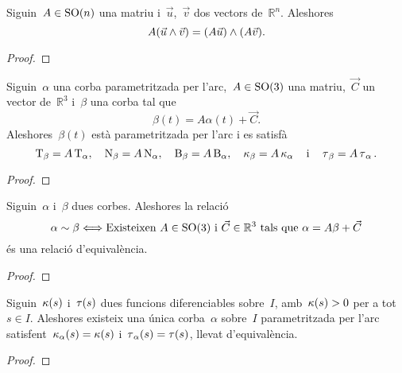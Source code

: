 \documentclass[../../main.tex]{subfiles}
\begin{document}
    \begin{proposition}
        \label{prop:les matrius especials ortogonals conserven el producte vectorial}
        Siguin~\(A\in\operatorname{SO}(n)\) una matriu i~\(\vec{u}\),~\(\vec{v}\) dos vectors de~\(\mathbb{R}^{n}\).
        Aleshores
        \[
            A(\vec{u}\mathbin{\wedge}\vec{v})=(A\vec{u})\mathbin{\wedge}(A\vec{v}).
        \]
        \begin{proof}
        \end{proof}
    \end{proposition}
    \begin{corollary}
        \label{cor:una corba parametritzada per l'arc i la seva imatge per una aplicació que conserva les distàncies són equivalents}
        Siguin~\(\alpha\) una corba parametritzada per l'arc,~\(A\in\operatorname{SO}(3)\) una matriu,~\(\vec{C}\) un vector de~\(\mathbb{R}^{3}\) i~\(\beta\) una corba tal que
        \[
            \beta(t)=A\alpha(t)+\vec{C}.
        \]
        Aleshores~\(\beta(t)\) està parametritzada per l'arc i es satisfà
        \[
            \operatorname{T}_{\beta}=A\operatorname{T}_{\alpha},\quad\operatorname{N}_{\beta}=A\operatorname{N}_{\alpha},\quad\operatorname{B}_{\beta}=A\operatorname{B}_{\alpha},\quad\operatorname{\kappa}_{\beta}=A\operatorname{\kappa}_{\alpha}\quad\text{i}\quad\operatorname{\tau}_{\beta}=A\operatorname{\tau}_{\alpha}.
        \]
        \begin{proof}
        \end{proof}
    \end{corollary}
    \begin{lemma}
        \label{lemma:Teorema Fonamental de la teoria local de corbes}
        Siguin~\(\alpha\) i~\(\beta\) dues corbes.
        Aleshores la relació
        \[
            \alpha\sim\beta \Longleftrightarrow \text{Existeixen }A\in\operatorname{SO}(3)\text{ i }\vec{C}\in\mathbb{R}^{3}\text{ tals que }\alpha=A\beta+\vec{C}
        \]
        és una relació d'equivalència.
        \begin{proof}
        \end{proof}
    \end{lemma}
    \begin{theorem}
        \label{thm:Teorema Fonamental de la teoria local del corbes}
        Siguin~\(\operatorname{\kappa}(s)\) i~\(\operatorname{\tau}(s)\) dues funcions diferenciables sobre~\(I\), amb~\(\operatorname{\kappa}(s)>0\) per a tot~\(s\in I\).
        Aleshores existeix una única corba~\(\alpha\) sobre~\(I\) parametritzada per l'arc satisfent~\(\operatorname{\kappa}_{\alpha}(s)=\operatorname{\kappa}(s)\) i~\(\operatorname{\tau}_{\alpha}(s)=\operatorname{\tau}(s)\), llevat d'equivalència.
        \begin{proof}
        \end{proof}
    \end{theorem}
\end{document}
